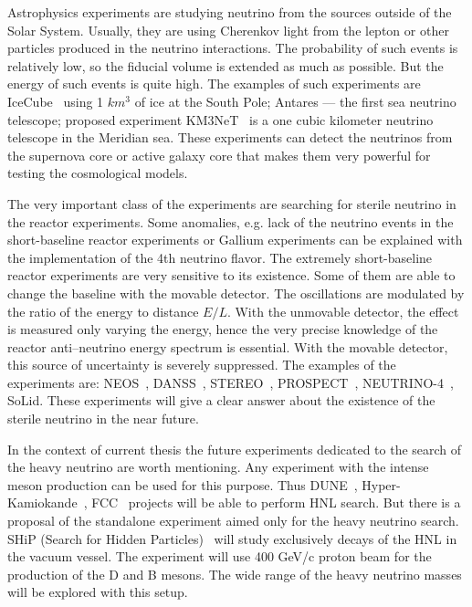 \documentclass[../main.tex]{subfiles}
\begin{document}
Astrophysics experiments are studying neutrino from the sources outside of the Solar System. Usually, they are using Cherenkov light from the lepton or other particles produced in the neutrino interactions. The probability of such events is relatively low, so the fiducial volume is extended as much as possible. But the energy of such events is quite high. The examples of such experiments are IceCube~\cite{Aartsen2017} using 1 $km^3$ of ice at the South Pole; Antares --- the first sea neutrino telescope; proposed experiment KM3NeT~\cite{LeBreton2019} is a one cubic kilometer neutrino telescope in the Meridian sea. These experiments can detect the neutrinos from the supernova core or active galaxy core that makes them very powerful for testing the cosmological models.

The very important class of the experiments are searching for sterile neutrino in the reactor experiments. Some anomalies, e.g. lack of the neutrino events in the short-baseline reactor experiments or Gallium experiments can be explained with the implementation of the 4th neutrino flavor. The extremely short-baseline reactor experiments are very sensitive to its existence. Some of them are able to change the baseline with the movable detector. The oscillations are modulated by the ratio of the energy to distance $E/L$. With the unmovable detector, the effect is measured only varying the energy, hence the very precise knowledge of the reactor anti--neutrino energy spectrum is essential. With the movable detector, this source of uncertainty is severely suppressed. The examples of the experiments are: NEOS~\cite{Ko2017}, DANSS~\cite{Alekseev2018}, STEREO~\cite{Almazan2018}, PROSPECT~\cite{Ashenfelter2018}, NEUTRINO-4~\cite{Serebrov2015}, SoLid. These experiments will give a clear answer about the existence of the sterile neutrino in the near future.

In the context of current thesis the future experiments dedicated to the search of the heavy neutrino are worth mentioning. Any experiment with the intense meson production can be used for this purpose. Thus DUNE~\cite{Acciarri2016}, Hyper-Kamiokande~\cite{Proto-Collaboration2018}, FCC~\cite{Collaboration2019} projects will be able to perform HNL search. But there is a proposal of the standalone experiment aimed only for the heavy neutrino search. SHiP (Search for Hidden Particles)~\cite{SHiPCollaboration2018a} will study exclusively decays of the HNL in the vacuum vessel. The experiment will use 400 GeV/c proton beam for the production of the D and B mesons. The wide range of the heavy neutrino masses will be explored with this setup.
\end{document}
